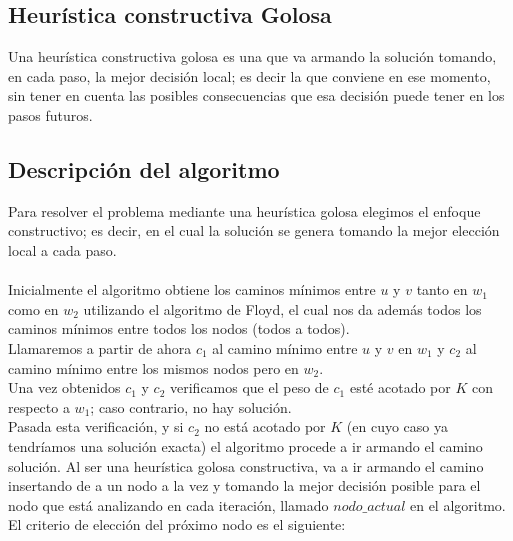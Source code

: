 \subsection{Heur\'istica constructiva Golosa}

Una heur\'istica constructiva golosa es una que va armando la soluci\'on tomando, en cada paso, la mejor decisi\'on local; es decir la que conviene en ese momento, sin tener en cuenta las posibles consecuencias que esa decisi\'on puede tener en los pasos futuros.\\

\subsection{Descripci\'on del algoritmo}

Para resolver el problema mediante una heur\'istica golosa elegimos el enfoque constructivo; es decir, en el cual la soluci\'on se genera tomando la mejor elecci\'on local a cada paso.\\\\

Inicialmente el algoritmo obtiene los caminos m\'inimos entre $u$ y $v$ tanto en $w_1$ como en $w_2$ utilizando el algoritmo de Floyd, el cual nos da adem\'as todos los caminos m\'inimos entre todos los nodos (todos a todos).\\
Llamaremos a partir de ahora $c_1$ al camino m\'inimo entre $u$ y $v$ en $w_1$ y $c_2$ al camino m\'inimo entre los mismos nodos pero en $w_2$.\\
Una vez obtenidos $c_1$ y $c_2$ verificamos que el peso de $c_1$ est\'e acotado por $K$ con respecto a $w_1$; caso contrario, no hay soluci\'on.\\
Pasada esta verificaci\'on, y si $c_2$ no est\'a acotado por $K$ (en cuyo caso ya tendr\'iamos una soluci\'on exacta) el algoritmo procede a ir armando el camino soluci\'on. Al ser una heur\'istica golosa constructiva, va a ir armando el camino insertando de a un nodo a la vez y tomando la mejor decisi\'on posible para el nodo que est\'a analizando en cada iteraci\'on, llamado $nodo\_actual$ en el algoritmo. 
El criterio de elecci\'on del pr\'oximo nodo es el siguiente: 

